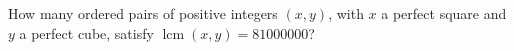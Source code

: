 How many ordered pairs of positive integers $(x,y)$, with $ x $ a perfect square and $ y $ a perfect cube, satisfy $\operatorname{lcm}(x,y)=81000000 $?
